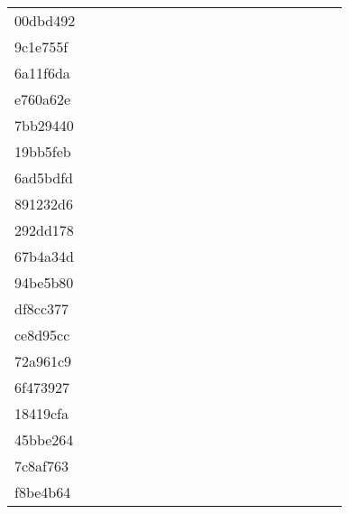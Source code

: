 \begin{table*}[htb]
\begin{tabular}{l|cccccccccccccccccc}
00dbd492  & \C & \X & \X & \X & \X & \C & \X & \X & \X & \X & \X & \X & \C & \C & \C & \C & \C \\
9c1e755f  & \C & \X & \X & \X & \X & \C & \C & \X & \C & \X & \X & \C & \C & \C & \C & \C & \C \\
6a11f6da  & \C & \X & \X & \X & \X & \X & \X & \C & \C & \C & \C & \C & \C & \C & \C & \C & \C \\
e760a62e  & \C & \X & \X & \X & \X & \X & \X & \X & \X & \X & \X & \X & \X & \C & \C & \C & \C \\
7bb29440  & \C & \X & \X & \X & \X & \X & \X & \X & \X & \X & \X & \X & \X & \C & \C & \X & \X \\
19bb5feb  & \C & \X & \X & \C & \C & \C & \C & \C & \C & \C & \C & \C & \C & \C & \C & \C & \C \\
6ad5bdfd  & \C & \X & \X & \X & \X & \X & \X & \X & \X & \X & \X & \X & \X & \C & \C & \X & \X \\
891232d6  & \X & \X & \X & \X & \X & \X & \X & \X & \X & \X & \X & \X & \X & \X & \X & \X & \X \\
292dd178  & \C & \X & \X & \X & \X & \X & \X & \X & \X & \X & \X & \X & \X & \C & \C & \C & \C \\
67b4a34d  & \C & \X & \X & \X & \X & \X & \X & \X & \X & \X & \X & \X & \X & \C & \C & \C & \C \\
94be5b80  & \C & \X & \X & \X & \X & \X & \X & \X & \X & \X & \X & \X & \C & \C & \C & \X & \X \\
df8cc377  & \C & \X & \X & \X & \X & \X & \X & \X & \X & \X & \X & \X & \X & \C & \C & \X & \X \\
ce8d95cc  & \C & \X & \X & \X & \X & \C & \C & \X & \C & \X & \X & \C & \C & \C & \C & \C & \C \\
72a961c9  & \C & \X & \X & \X & \X & \X & \X & \X & \X & \C & \C & \C & \C & \C & \C & \C & \C \\
6f473927  & \C & \X & \C & \X & \X & \X & \X & \C & \X & \C & \C & \C & \C & \C & \C & \C & \C \\
18419cfa  & \C & \X & \X & \X & \X & \X & \X & \X & \X & \X & \X & \X & \X & \C & \C & \X & \X \\
45bbe264  & \C & \X & \X & \X & \C & \C & \X & \C & \C & \C & \C & \C & \C & \C & \C & \C & \C \\
7c8af763  & \C & \X & \X & \X & \X & \X & \X & \X & \X & \X & \X & \X & \X & \C & \C & \C & \X \\
f8be4b64  & \C & \X & \X & \X & \X & \X & \X & \X & \X & \X & \X & \X & \X & \C & \C & \X & \X \\

\end{tabular}
\end{table*}
